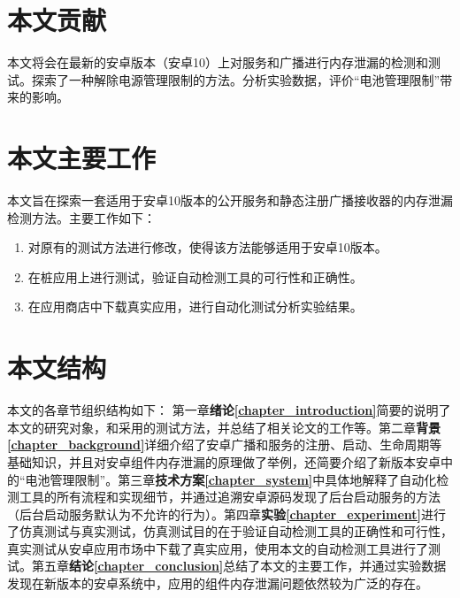 \section{本文贡献}

本文将会在最新的安卓版本（安卓10）上对服务和广播进行内存泄漏的检测和测试。探索了一种解除电源管理限制的方法。分析实验数据，评价“电池管理限制”带来的影响。

\section{本文主要工作}
本文旨在探索一套适用于安卓10版本的公开服务和静态注册广播接收器的内存泄漏检测方法。主要工作如下：
\newline
\begin{enumerate}
\item 对原有的测试方法进行修改，使得该方法能够适用于安卓10版本。

\item 在桩应用上进行测试，验证自动检测工具的可行性和正确性。

\item 在应用商店中下载真实应用，进行自动化测试分析实验结果。

\end{enumerate}
\section{本文结构}
本文的各章节组织结构如下：
第一章\textbf{绪论\ref{chapter_introduction}}简要的说明了本文的研究对象，和采用的测试方法，并总结了相关论文的工作等。第二章\textbf{背景\ref{chapter_background}}详细介绍了安卓广播和服务的注册、启动、生命周期等基础知识，并且对安卓组件内存泄漏的原理做了举例，还简要介绍了新版本安卓中的“电池管理限制”。第三章\textbf{技术方案\ref{chapter_system}}中具体地解释了自动化检测工具的所有流程和实现细节，并通过追溯安卓源码发现了后台启动服务的方法（后台启动服务默认为不允许的行为）。第四章\textbf{实验\ref{chapter_experiment}}进行了仿真测试与真实测试，仿真测试目的在于验证自动检测工具的正确性和可行性，真实测试从安卓应用市场中下载了真实应用，使用本文的自动检测工具进行了测试。第五章\textbf{结论\ref{chapter_conclusion}}总结了本文的主要工作，并通过实验数据发现在新版本的安卓系统中，应用的组件内存泄漏问题依然较为广泛的存在。